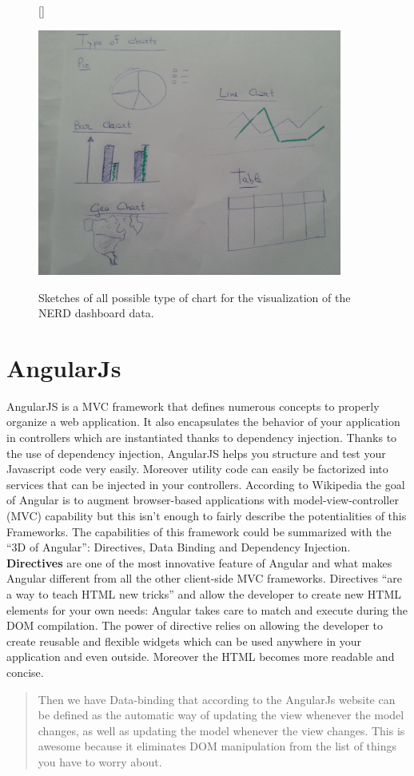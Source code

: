 \documentclass[a4paper,13pt]{report}
\begin{document}
\begin{figure}[H]
[\FBwidth]
{\caption{Sketches of all possible type of chart for the visualization of the NERD dashboard data.}\label{fig:test}}
{\includegraphics[width=10cm]{pics/UISketches/chart1}}
\end{figure}

\section{AngularJs}
AngularJS is a MVC framework that defines numerous concepts to properly organize a web application. It also encapsulates the behavior of your application in controllers which are instantiated thanks to dependency injection. Thanks to the use of dependency injection, AngularJS helps you structure and test your Javascript code very easily. Moreover utility code can easily be factorized into services that can be injected in your controllers.\newline
According to Wikipedia the goal of Angular is to augment browser-based applications with model-view-controller (MVC) capability but this isn't enough to fairly describe the potentialities of this Frameworks.
The capabilities of this framework could be summarized with the ``3D of Angular'': Directives, Data Binding and Dependency Injection.\newline
\textbf{Directives} are one of the most innovative feature of Angular and what makes Angular different from all the other client-side MVC frameworks. Directives ``are a way to teach HTML new tricks'' and allow the developer to create new HTML elements for your own needs: Angular takes care to match and execute during the DOM compilation.
The power of directive relies on allowing the developer to create reusable and flexible widgets which can be used anywhere in your application and even outside. Moreover the HTML becomes more readable and concise.
\newline
\begin{quotation}
  Then we have Data-binding that according to the AngularJs website can be defined as the automatic way of updating the view whenever the model changes, as well as updating the model whenever the view changes. This is awesome because it eliminates DOM manipulation from the list of things you have to worry about.
\end{quotation}
\end{document}
